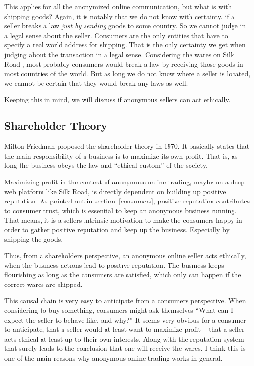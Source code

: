 This applies for all the anonymized online communication, but what is with shipping goods? Again, it is notably that we do not know with certainty, if a seller breaks a law \emph{just by sending} goods to some country. So we cannot judge in a legal sense about the seller. Consumers are the only entities that have to specify a real world address for shipping. That is the only certainty we get when judging about the transaction in a legal sense. Considering the wares on Silk Road \cite{silkroad2013}, most probably consumers would break a law by receiving those goods in most countries of the world. But as long we do not know where a seller is located, we cannot be certain that they would break any laws as well.

Keeping this in mind, we will discuss if anonymous sellers can act ethically.

\subsection{Shareholder Theory}

Milton Friedman proposed the shareholder theory in 1970. It basically states that the main responsibility of a business is to maximize its own profit. That is, as long the business obeys the law and ``ethical custom'' of the society\cite{shareholder}. 

Maximizing profit in the context of anonymous online trading, maybe on a deep web platform like Silk Road, is directly dependent on building up positive reputation. As pointed out in section~\ref{consumers}, positive reputation contributes to consumer trust, which is essential to keep an anonymous business running. That means, it is a sellers intrinsic motivation to make the consumers happy in order to gather positive reputation and keep up the business. Especially by shipping the goods.

Thus, from a shareholders perspective, an anonymous online seller acts ethically, when the business actions lead to positive reputation. The business keeps flourishing as long as the consumers are satisfied, which only can happen if the correct wares are shipped.

This causal chain is very easy to anticipate from a consumers perspective. When considering to buy something, consumers might ask themselves ``What can I expect the seller to behave like, and why?'' It seems very obvious for a consumer to anticipate, that a seller would at least want to maximize profit -- that a seller acts ethical at least up to their own interests. Along with the reputation system that surely leads to the conclusion that one will receive the wares. I think this is one of the main reasons why anonymous online trading works in general.

